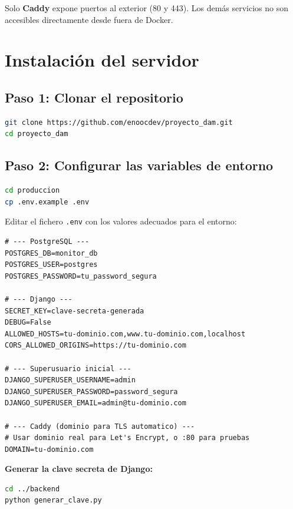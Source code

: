 \documentclass[12pt,a4paper]{article}
\begin{document}
Solo \textbf{Caddy} expone puertos al exterior (80 y 443). Los demás servicios no son accesibles directamente desde fuera de Docker.

\section{Instalación del servidor}

\subsection{Paso 1: Clonar el repositorio}

\begin{lstlisting}[language=bash]
git clone https://github.com/enoocdev/proyecto_dam.git
cd proyecto_dam
\end{lstlisting}

\subsection{Paso 2: Configurar las variables de entorno}

\begin{lstlisting}[language=bash]
cd produccion
cp .env.example .env
\end{lstlisting}

Editar el fichero \texttt{.env} con los valores adecuados para el entorno:

\begin{lstlisting}[language=dotenv,title={Ejemplo de .env}]
# --- PostgreSQL ---
POSTGRES_DB=monitor_db
POSTGRES_USER=postgres
POSTGRES_PASSWORD=tu_password_segura

# --- Django ---
SECRET_KEY=clave-secreta-generada
DEBUG=False
ALLOWED_HOSTS=tu-dominio.com,www.tu-dominio.com,localhost
CORS_ALLOWED_ORIGINS=https://tu-dominio.com

# --- Superusuario inicial ---
DJANGO_SUPERUSER_USERNAME=admin
DJANGO_SUPERUSER_PASSWORD=password_segura
DJANGO_SUPERUSER_EMAIL=admin@tu-dominio.com

# --- Caddy (dominio para TLS automatico) ---
# Usar dominio real para Let's Encrypt, o :80 para pruebas
DOMAIN=tu-dominio.com
\end{lstlisting}

\textbf{Generar la clave secreta de Django:}

\begin{lstlisting}[language=bash]
cd ../backend
python generar_clave.py
\end{lstlisting}
\end{document}
